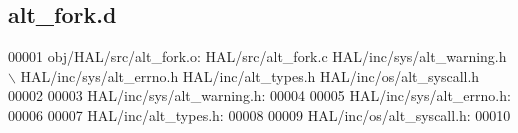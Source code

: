 \subsection{alt\+\_\+fork.\+d}
\label{alt__fork_8d_source}

\begin{DoxyCode}
00001 obj/HAL/src/alt\_fork.o: HAL/src/alt\_fork.c HAL/inc/sys/alt\_warning.h \(\backslash\)
 HAL/inc/sys/alt_errno.h HAL/inc/alt\_types.h HAL/inc/os/alt\_syscall.h
00002 
00003 HAL/inc/sys/alt\_warning.h:
00004 
00005 HAL/inc/sys/alt_errno.h:
00006 
00007 HAL/inc/alt\_types.h:
00008 
00009 HAL/inc/os/alt\_syscall.h:
00010 \end{DoxyCode}
